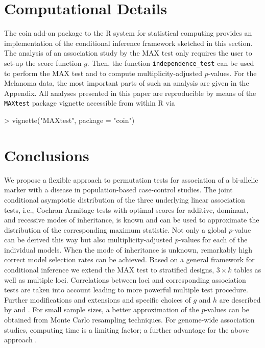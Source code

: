 \documentclass[bimj,fleqn]{w-art}
\newcommand{\Rpackage}[1]{{\normalfont\fontseries{b}\selectfont #1}}
\begin{document}
\section{Computational Details}

The \Rpackage{coin} add-on package \citep{Hothorn:2006:AmStat, PKG:coin, Hothorn+Hornik+VanDeWiel:2008}
to the \textsf{R} system for statistical computing \citep{rcore2007}
provides an implementation of the conditional inference framework
sketched in this section. The analysis of an association study 
by the MAX test only requires the user to set-up the score function $g$. Then, the
function \texttt{independence\_test} can be used to perform 
the MAX test and to compute multiplicity-adjusted $p$-values.
For the Melanoma data, the most important parts of such an analysis are
given in the Appendix. All analyses presented in this paper
are reproducible by means of the \texttt{MAXtest} package vignette
accessible from within \textsf{R} via
\begin{Schunk}
\begin{Sinput}
> vignette("MAXtest", package = "coin")
\end{Sinput}
\end{Schunk}


\section{Conclusions}

We propose a flexible approach to permutation tests for association of a    
bi-allelic marker with a disease in population-based case-control 
studies. The joint conditional asymptotic distribution of the 
three underlying 
linear association tests, i.e., Cochran-Armitage tests with optimal
scores for additive, dominant, and recessive modes of inheritance,
is known and can be used to approximate the distribution of the 
corresponding maximum statistic.
Not only a global $p$-value can be derived this way but also
multiplicity-adjusted $p$-values for each of the individual models. 
When the mode of inheritance is unknown, remarkably high correct model 
selection rates can be achieved. Based on a general framework for conditional 
inference we extend the MAX test to stratified designs, $3 \times k$ tables 
as well as multiple loci. Correlations between 
loci and corresponding association tests are taken into account leading to 
more powerful multiple test procedure. Further modifications and extensions
and specific choices of $g$ and $h$ are described by \cite{Hothorn:2006:AmStat} 
and \cite{Hothorn+Hornik+VanDeWiel:2008}.
For small sample sizes, a better approximation of the $p$-values 
can be obtained from Monte Carlo resampling techniques.
For genome-wide association studies, computing time is a limiting factor; 
a further advantage for the above approach \citep{Ziegler2008}.
\end{document}
